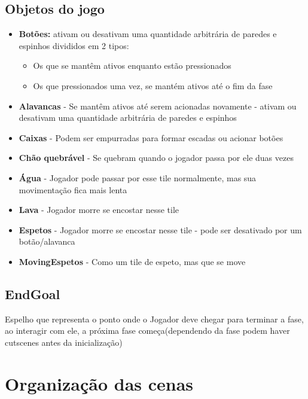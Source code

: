 \documentclass[a4paper, 11pt]{article}
\begin{document}
	\subsection{Objetos do jogo} 
		\begin{itemize} 
			\item \textbf{Botões:} ativam ou desativam uma quantidade arbitrária de paredes e espinhos divididos em 2 tipos: 
			\begin{itemize}
			        \item Os que se mantêm ativos enquanto estão pressionados
			        \item Os que pressionados uma vez, se mantém ativos até o fim da fase
			\end{itemize}   
			\item \textbf{Alavancas} - Se mantêm ativos até serem acionadas novamente - ativam ou desativam uma quantidade arbitrária de paredes e espinhos 
			\item \textbf{Caixas} - Podem ser empurradas para formar escadas ou acionar botões 
			\item \textbf{Chão quebrável} - Se quebram quando o jogador passa por ele duas vezes 
			\item \textbf{Água} - Jogador pode passar por esse tile normalmente, mas sua movimentação fica mais lenta 
			\item \textbf{Lava} - Jogador morre se encostar nesse tile 
			\item \textbf{Espetos} - Jogador morre se encostar nesse tile - pode ser desativado por um botão/alavanca
			\item \textbf{MovingEspetos} - Como um tile de espeto, mas que se move 
		\end{itemize} 
 		\subsection{EndGoal}
 			Espelho que representa o ponto onde o Jogador deve chegar para terminar a fase, ao interagir com ele, a próxima fase começa(dependendo da fase podem haver cutscenes antes da inicialização)
	
\section{Organização das cenas} 
\end{document}
